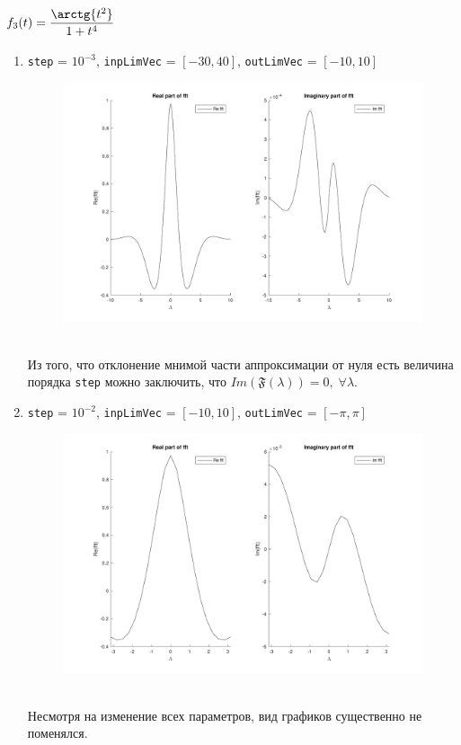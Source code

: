 \documentclass[11pt, oneside, final]{article}
\numberwithin{equation}{section}
\newcommand \four[1][\lambda]{\mathfrak{F}(#1)}
\begin{document}
    \subsection{\( f_3(t) = \dfrac{\arctg{t^2}}{1 + t^4}\)} %
    \begin{enumerate}
        \item
        \label{it:f31}
        \texttt{step} = \(10^{-3}\), \texttt{inpLimVec} = \( [-30, 40] \), \texttt{outLimVec} = \( [-10, 10] \)
        \begin{figure}[!h]
            \centering
            \includegraphics[width=\linewidth]{f3fig1}
            \label{pic:f3:1}
        \end{figure} \\
        Из того, что отклонение мнимой части аппроксимации от нуля есть величина порядка \texttt{step} можно заключить,
        что \(Im(\four) = 0, \; \forall \lambda \). 
        \clearpage
        \item
        \label{it:f32}
        \texttt{step} = \(10^{-2}\), \texttt{inpLimVec} = \( [-10, 10] \), \texttt{outLimVec} = \( [-\pi, \pi] \)
        \begin{figure}[!h]
            \centering
            \includegraphics[width=\linewidth]{f3fig2}
            \label{pic:f3:2}
        \end{figure} \\
        Несмотря на изменение всех параметров, вид графиков существенно не поменялся.
    \label{sub:f3}
    \end{enumerate}
    \clearpage
\end{document}
